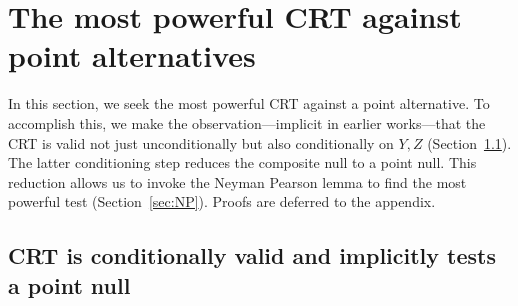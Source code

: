 \documentclass[12pt]{article}
\theoremstyle{definition}
\theoremstyle{remark}
\newcommand{\srx}{X}
\newcommand{\srz}{Z}
\newcommand{\srxk}{\widetilde X}
\newcommand{\sry}{Y}
\begin{document}
%

\section{The most powerful CRT against point alternatives} \label{sec:power}

In this section, we seek the most powerful CRT against a point alternative. To accomplish this, we make the observation---implicit in earlier works---that the CRT is valid not just unconditionally but also conditionally on $\sry, \srz$ (Section~\ref{sec:bridge}). The latter conditioning step reduces the composite null to a point null. This reduction allows us to invoke the Neyman Pearson lemma to find the most powerful test  (Section~\ref{sec:NP}). Proofs are deferred to the appendix.

\subsection{CRT is conditionally valid and implicitly tests a point null} \label{sec:bridge}
\end{document}
